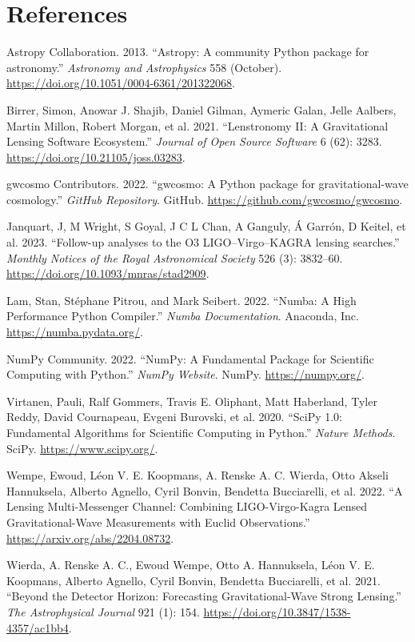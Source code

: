 \documentclass[10pt,a4paper,onecolumn]{article}
\let\textttOrig=\texttt
\def\texttt#1{\expandafter\textttOrig{\seqsplit{#1}}}
\newlength{\cslhangindent}
\newenvironment{CSLReferences}[3] %
 {%
  \setlength{\parindent}{0pt}
  \ifodd #1 \everypar{\setlength{\hangindent}{\cslhangindent}}\ignorespaces\fi
  \ifnum #2 > 0
  \setlength{\parskip}{#2\baselineskip}
  \fi
 }%
 {}
\let\addcontentslineOrig=\addcontentsline
\def\addcontentsline#1#2#3{\bgroup
  \let\texttt=\textttOrig\addcontentslineOrig{#1}{#2}{#3}\egroup}
\begin{document}
\section*{References}\label{references}

\label{refs}
\begin{CSLReferences}{1}{0}
\bibitem[\citeproctext]{ref-astropy}
Astropy Collaboration. 2013. {``{Astropy: A community Python package for
astronomy}.''} \emph{Astronomy and Astrophysics} 558 (October).
\url{https://doi.org/10.1051/0004-6361/201322068}.

Birrer, Simon, Anowar J. Shajib, Daniel Gilman, Aymeric Galan, Jelle
Aalbers, Martin Millon, Robert Morgan, et al. 2021. {``Lenstronomy II: A
Gravitational Lensing Software Ecosystem.''} \emph{Journal of Open
Source Software} 6 (62): 3283.
\url{https://doi.org/10.21105/joss.03283}.

gwcosmo Contributors. 2022. {``{gwcosmo: A Python package for
gravitational-wave cosmology}.''} \emph{GitHub Repository}. GitHub.
\url{https://github.com/gwcosmo/gwcosmo}.

Janquart, J, M Wright, S Goyal, J C L Chan, A Ganguly, Á Garrón, D
Keitel, et al. 2023. {``{Follow-up analyses to the O3 LIGO--Virgo--KAGRA
lensing searches}.''} \emph{Monthly Notices of the Royal Astronomical
Society} 526 (3): 3832--60.
\url{https://doi.org/10.1093/mnras/stad2909}.

Lam, Stan, Stéphane Pitrou, and Mark Seibert. 2022. {``Numba: A High
Performance Python Compiler.''} \emph{Numba Documentation}. Anaconda,
Inc. \url{https://numba.pydata.org/}.

NumPy Community. 2022. {``NumPy: A Fundamental Package for Scientific
Computing with Python.''} \emph{NumPy Website}. NumPy.
\url{https://numpy.org/}.

Virtanen, Pauli, Ralf Gommers, Travis E. Oliphant, Matt Haberland, Tyler
Reddy, David Cournapeau, Evgeni Burovski, et al. 2020. {``{SciPy 1.0:
Fundamental Algorithms for Scientific Computing in Python}.''}
\emph{Nature Methods}. SciPy. \url{https://www.scipy.org/}.

Wempe, Ewoud, Léon V. E. Koopmans, A. Renske A. C. Wierda, Otto Akseli
Hannuksela, Alberto Agnello, Cyril Bonvin, Bendetta Bucciarelli, et al.
2022. {``A Lensing Multi-Messenger Channel: Combining LIGO-Virgo-Kagra
Lensed Gravitational-Wave Measurements with Euclid Observations.''}
\url{https://arxiv.org/abs/2204.08732}.

Wierda, A. Renske A. C., Ewoud Wempe, Otto A. Hannuksela, Léon V. E.
Koopmans, Alberto Agnello, Cyril Bonvin, Bendetta Bucciarelli, et al.
2021. {``Beyond the Detector Horizon: Forecasting Gravitational-Wave
Strong Lensing.''} \emph{The Astrophysical Journal} 921 (1): 154.
\url{https://doi.org/10.3847/1538-4357/ac1bb4}.

\end{CSLReferences}
\end{document}
